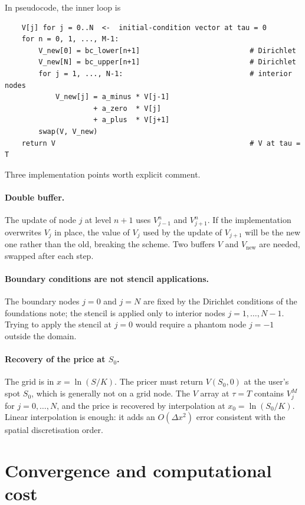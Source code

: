 \documentclass[11pt,a4paper]{article}
\begin{document}
In pseudocode, the inner loop is
\begin{verbatim}
    V[j] for j = 0..N  <-  initial-condition vector at tau = 0
    for n = 0, 1, ..., M-1:
        V_new[0] = bc_lower[n+1]                          # Dirichlet
        V_new[N] = bc_upper[n+1]                          # Dirichlet
        for j = 1, ..., N-1:                              # interior nodes
            V_new[j] = a_minus * V[j-1]
                     + a_zero  * V[j]
                     + a_plus  * V[j+1]
        swap(V, V_new)
    return V                                              # V at tau = T
\end{verbatim}

Three implementation points worth explicit comment.

\paragraph{Double buffer.} The update of node $j$ at level $n+1$ uses
$V_{j-1}^n$ and $V_{j+1}^n$. If the implementation overwrites
$V_j$ in place, the value of $V_j$ used by the update of $V_{j+1}$
will be the new one rather than the old, breaking the scheme. Two
buffers $V$ and $V_{\text{new}}$ are needed, swapped after each step.

\paragraph{Boundary conditions are not stencil applications.} The
boundary nodes $j = 0$ and $j = N$ are fixed by the Dirichlet
conditions of the foundations note; the stencil is applied only to interior
nodes $j = 1, \dots, N-1$. Trying to apply the stencil at $j = 0$
would require a phantom node $j = -1$ outside the domain.

\paragraph{Recovery of the price at $S_0$.} The grid is in $x =
\ln(S/K)$. The pricer must return $V(S_0, 0)$ at the user's spot
$S_0$, which is generally not on a grid node. The $V$ array at
$\tau = T$ contains $V_j^M$ for $j = 0, \dots, N$, and the price is
recovered by interpolation at $x_0 = \ln(S_0/K)$. Linear
interpolation is enough: it adds an $O(\Delta x^2)$ error consistent
with the spatial discretisation order.

\section{Convergence and computational cost}
\end{document}

